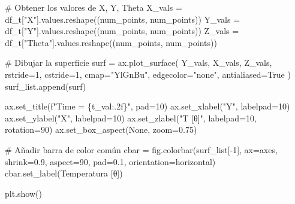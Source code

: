 \documentclass[
  spanish,
  us-letterpaper,
]{scrreprt}
\newenvironment{Shaded}{\begin{snugshade}}{\end{snugshade}}
\newcommand{\CommentTok}[1]{\textcolor[rgb]{0.37,0.37,0.37}{#1}}
\newcommand{\DecValTok}[1]{\textcolor[rgb]{0.68,0.00,0.00}{#1}}
\newcommand{\FloatTok}[1]{\textcolor[rgb]{0.68,0.00,0.00}{#1}}
\newcommand{\NormalTok}[1]{\textcolor[rgb]{0.00,0.23,0.31}{#1}}
\newcommand{\OperatorTok}[1]{\textcolor[rgb]{0.37,0.37,0.37}{#1}}
\newcommand{\SpecialCharTok}[1]{\textcolor[rgb]{0.37,0.37,0.37}{#1}}
\newcommand{\SpecialStringTok}[1]{\textcolor[rgb]{0.13,0.47,0.30}{#1}}
\newcommand{\StringTok}[1]{\textcolor[rgb]{0.13,0.47,0.30}{#1}}
\newcommand{\VariableTok}[1]{\textcolor[rgb]{0.07,0.07,0.07}{#1}}
\theoremstyle{definition}
\theoremstyle{plain}
\theoremstyle{remark}
\begin{document}
\begin{Shaded}
\begin{Highlighting}[]
    \CommentTok{\# Obtener los valores de X, Y, Theta}
\NormalTok{    X\_vals }\OperatorTok{=}\NormalTok{ df\_t[}\StringTok{"X"}\NormalTok{].values.reshape((num\_points, num\_points))}
\NormalTok{    Y\_vals }\OperatorTok{=}\NormalTok{ df\_t[}\StringTok{"Y"}\NormalTok{].values.reshape((num\_points, num\_points))}
\NormalTok{    Z\_vals }\OperatorTok{=}\NormalTok{ df\_t[}\StringTok{"Theta"}\NormalTok{].values.reshape((num\_points, num\_points))}

    \CommentTok{\# Dibujar la superficie}
\NormalTok{    surf }\OperatorTok{=}\NormalTok{ ax.plot\_surface(}
\NormalTok{        Y\_vals, X\_vals, Z\_vals,}
\NormalTok{        rstride}\OperatorTok{=}\DecValTok{1}\NormalTok{, cstride}\OperatorTok{=}\DecValTok{1}\NormalTok{,}
\NormalTok{        cmap}\OperatorTok{=}\StringTok{"YlGnBu"}\NormalTok{,}
\NormalTok{        edgecolor}\OperatorTok{=}\StringTok{"none"}\NormalTok{,}
\NormalTok{        antialiased}\OperatorTok{=}\VariableTok{True}
\NormalTok{    )}
\NormalTok{    surf\_list.append(surf)}

\NormalTok{    ax.set\_title(}\SpecialStringTok{f"Time = }\SpecialCharTok{\{}\NormalTok{t\_val}\SpecialCharTok{:.2f\}}\SpecialStringTok{"}\NormalTok{, pad}\OperatorTok{=}\DecValTok{10}\NormalTok{)}
\NormalTok{    ax.set\_xlabel(}\StringTok{"Y"}\NormalTok{, labelpad}\OperatorTok{=}\DecValTok{10}\NormalTok{)}
\NormalTok{    ax.set\_ylabel(}\StringTok{"X"}\NormalTok{, labelpad}\OperatorTok{=}\DecValTok{10}\NormalTok{)}
\NormalTok{    ax.set\_zlabel(}\StringTok{"T [θ]"}\NormalTok{, labelpad}\OperatorTok{=}\DecValTok{10}\NormalTok{, rotation}\OperatorTok{=}\DecValTok{90}\NormalTok{)}
\NormalTok{    ax.set\_box\_aspect(}\VariableTok{None}\NormalTok{, zoom}\OperatorTok{=}\FloatTok{0.75}\NormalTok{)}

\CommentTok{\# Añadir barra de color común}
\NormalTok{cbar }\OperatorTok{=}\NormalTok{ fig.colorbar(surf\_list[}\OperatorTok{{-}}\DecValTok{1}\NormalTok{], ax}\OperatorTok{=}\NormalTok{axes,}
\NormalTok{                    shrink}\OperatorTok{=}\FloatTok{0.9}\NormalTok{, aspect}\OperatorTok{=}\DecValTok{90}\NormalTok{,}
\NormalTok{                    pad}\OperatorTok{=}\FloatTok{0.1}\NormalTok{, orientation}\OperatorTok{=}\StringTok{\textquotesingle{}horizontal\textquotesingle{}}\NormalTok{)}
\NormalTok{cbar.set\_label(}\StringTok{\textquotesingle{}Temperatura [θ]\textquotesingle{}}\NormalTok{)}

\NormalTok{plt.show()}
\end{Highlighting}
\end{Shaded}
\end{document}
